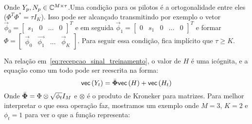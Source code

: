 \documentclass{article}
\begin{document}
	Onde $Y_p,N_p\in\mathbb{C}^{M\times \tau}$.Uma condição para os pilotos é a ortogonalidade entre eles ($\Phi^T\Phi^*=\tau I_K$). Isso pode ser alcançado transmitindo por exemplo o vetor $\vec{\phi}_0=\begin{bmatrix}s_1&0&\dots&0\end{bmatrix}^T$ e em seguida $\vec{\phi}_1=\begin{bmatrix}0&s_1&0&\dots&0\end{bmatrix}^T$ e formar $\Phi=\begin{bmatrix}\vec{\phi}_0&\vec{\phi_1}&\dots&\vec{\phi}_K\end{bmatrix}$. Para seguir essa condição, fica implícito que $\tau\ge K$.  
	
	Na relação em~\eqref{eq:recepcao_sinal_treinamento}, o valor de $H$ é uma icógnita, e a equação como um todo pode ser reescrita na forma:
	\begin{equation}
		 \mathsf{vec} \left( Y_t \right) =\bar{\boldsymbol{\Phi}} \mathsf{vec} \left( H \right) + \mathsf{vec} \left( H_t \right) 
		\label{eq:equacao_estimacao_canal}
	\end{equation}		
	Onde $\bar{\boldsymbol{\Phi}}=\Phi\otimes\sqrt{\phi_t}I_M$ e $\otimes$ é o produto de Kroneker para matrizes. Para melhor interpretar o que essa operação faz, mostramos um exemplo onde $M=3$, $K=2$ e $\phi_t=1$ para ver o que a função representa:
\end{document}
